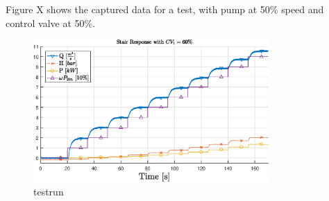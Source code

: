 Figure X shows the captured data for a test, with pump at 50\% speed and control valve at 50\%.

\begin{figure}[ht]
	\centering
	\includegraphics[width=0.8\textwidth]{figures/04ExperimentsAndLabWork/testrun}
	\vspace{-5mm}
	\caption{testrun}
	\label{fig:testrun}
\end{figure}
